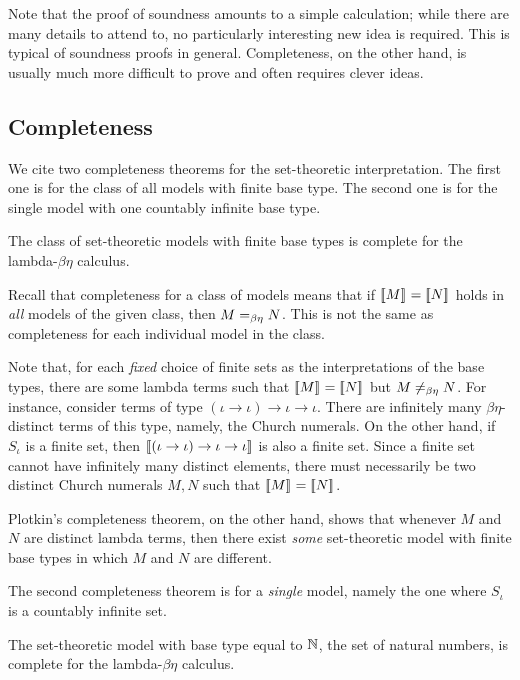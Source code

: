 \documentclass{article}
\begin{document}
Note that the proof of soundness amounts to a simple calculation;
while there are many details to attend to, no particularly interesting
new idea is required. This is typical of soundness proofs in general. 
Completeness, on the other hand, is usually much more difficult to
prove and often requires clever ideas.

\subsection{Completeness}

We cite two completeness theorems for the set-theoretic
interpretation. The first one is for the class of all models with
finite base type. The second one is for the single model with one
countably infinite base type.

\begin{theorem}
  The class of set-theoretic models with finite base types is complete
  for the lambda-$\beta\eta$ calculus. 
\end{theorem}

Recall that completeness for a class of models means that if
$[\![M]\!]_{}=[\![N]\!]_{}$ holds in {\em all} models of the given class, then
$M=_{\beta\eta} N$. This is not the same as completeness for each individual
model in the class. 

Note that, for each {\em fixed} choice of finite sets as the
interpretations of the base types, there are some lambda terms such
that $[\![M]\!]_{}=[\![N]\!]_{}$ but $M\not=_{\beta\eta} N$. For instance, consider
terms of type $(\iota\to\iota)\to\iota\to\iota$. There are infinitely
many $\beta\eta$-distinct terms of this type, namely, the Church
numerals. On the other hand, if $S_{\iota}$ is a finite set, then
$[\![(\iota\to\iota)\to\iota\to\iota]\!]_{}$ is also a finite set. Since a
finite set cannot have infinitely many distinct elements, there must
necessarily be two distinct Church numerals $M,N$ such that
$[\![M]\!]_{}=[\![N]\!]_{}$.

Plotkin's completeness theorem, on the other hand, shows that whenever
$M$ and $N$ are distinct lambda terms, then there exist {\em some}
set-theoretic model with finite base types in which $M$ and $N$ are
different.

The second completeness theorem is for a {\em single} model, namely
the one where $S_{\iota}$ is a countably infinite set.

\begin{theorem}
  The set-theoretic model with base type equal to $\mathbb{N}$, the set of
  natural numbers, is complete for the lambda-$\beta\eta$ calculus.
\end{theorem}
\end{document}
